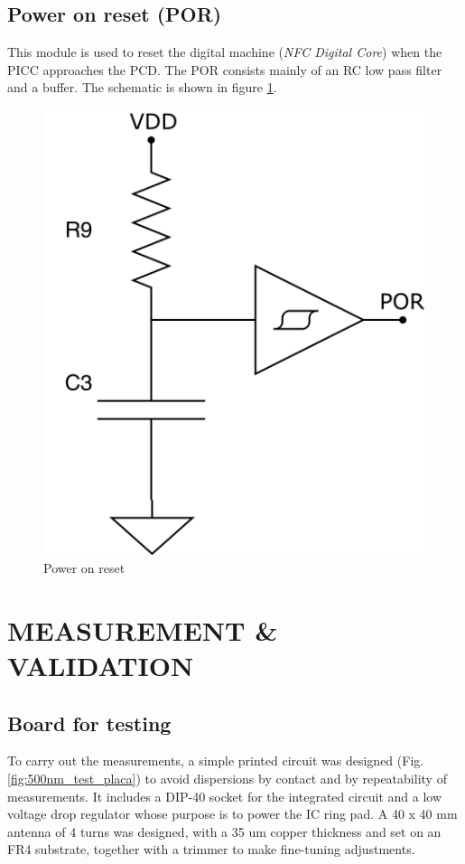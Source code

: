 \documentclass[a4paper, 10pt, conference]{ieeeconf}      %
\begin{document}
\subsection{Power on reset (POR)}
This module is used to reset the digital machine (\textit{NFC Digital Core}) when the PICC approaches the PCD. The POR consists mainly of an RC low pass filter and a buffer. The schematic is shown in figure \ref{fig:por}.

\begin{figure}[H]


\includegraphics[width=0.3\linewidth]{Images/ImagenesTesina/circuitos/POR.png}
\centering
\caption{Power on reset}
\label{fig:por}
\end{figure}

\section{MEASUREMENT \& VALIDATION}
\subsection{Board for testing}
To carry out the measurements, a simple printed circuit was designed (Fig.   \ref{fig:500nm_test_placa}) to avoid dispersions by contact and by repeatability of measurements. It includes a DIP-40 socket for the integrated circuit and a low voltage drop regulator whose purpose is to power the IC ring pad. A 40 x 40 mm antenna of 4 turns was designed, with a 35 um copper thickness and set on an FR4 substrate, together with a trimmer to make fine-tuning adjustments.
\end{document}
